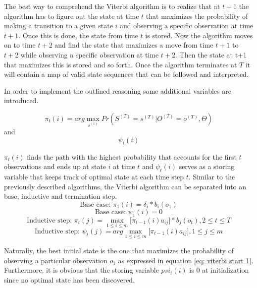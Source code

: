 The best way to comprehend the Viterbi algorithm is to realize that at $t+1$ the algorithm has to figure out the state at time $t$ that maximizes the probability of making a transition to a given state $i$ and observing a specific observation at time $t+1$. Once this is done, the state from time $t$ is stored. Now the algorithm moves on to time $t+2$ and find the state that maximizes a move from time $t+1$ to $t+2$ while observing a specific observation at time $t+2$. Then the state at t+1 that maximizes this is stored and so forth. Once the algorithm terminates at $T$ it will contain a map of valid state sequences that can be followed and interpreted. 

In order to implement the outlined reasoning some additional variables are introduced.

\begin{equation}
    \pi_t(i) =  arg\max_{s^{(t)}}Pr(S^{(T)} = s^{(T)}|O^{(T)} = o^{(T)}, \Theta)
\end{equation}
and 
$$
{\psi_t(i)}
$$

$\pi_t(i)$ finds the path with the highest probability that accounts for the first $t$ observations and ends up at state $i$ at time $t$ and $\psi_t(i)$ serves as a storing variable that keeps track of optimal state at each time step $t$. Similar to the previously described algorithms, the Viterbi algorithm can be separated into an base, inductive and termination step.
\begin{equation}
    \text{Base case: } \pi_1(i) = \delta_i*b_i(o_1)
    \label{eq: viterbi start 1}
\end{equation}
\begin{equation}
     \text{Base case: } \psi_1(i) = 0 
\end{equation}
\begin{equation}
    \text{Inductive step: } \pi_t(j) = \max_{1\leq i \leq m}\Big[\pi_{t-1}(i)a_{ij}\Big] *b_j(o_t), 2\leq t \leq T 
    \label{eq: inductive viterbi}
\end{equation}
\begin{equation}
    \text{Inductive step: }\psi_t(j) = {arg\max_{1\leq i \leq m} \Big[\pi_{t-1}(i)a_{ij}\Big]}, {1\leq j \leq m}
    \label{eq: inductive viterbi 2}
\end{equation}

Naturally, the best initial state is the one that maximizes the probability of observing a particular observation $o_1$ as expressed in equation \ref{eq: viterbi start 1}. Furthermore, it is obvious that the storing variable $psi_t(i)$ is 0 at initialization since no optimal state has been discovered.

